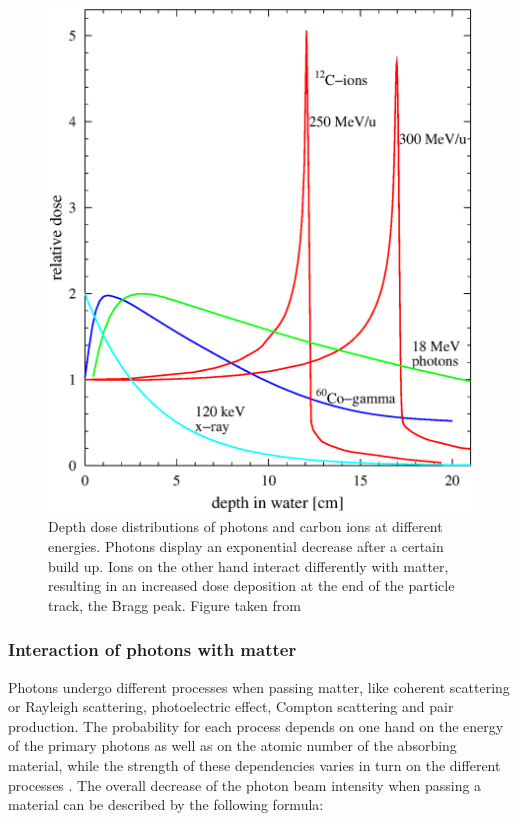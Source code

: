 \begin{figure}[H]
\begin{center}
\includegraphics[scale=0.7]{./teile/introduction/depthdose.eps}
\caption{Depth dose distributions of photons and carbon ions at different energies. Photons display an exponential decrease after a certain 
build up. Ions on the other hand interact differently with matter, resulting in an increased dose deposition at the end of the particle 
track, the Bragg peak. Figure taken from \cite{Sch10}}
\label{ddp}
\end{center}
\end{figure}

\newpage

\subsubsection{Interaction of photons with matter}

Photons undergo different processes when passing matter, like coherent scattering or Rayleigh scattering, photoelectric effect, Compton 
scattering and pair production. The probability for each process depends on one hand on the energy of the primary photons as well as on the 
atomic number of the absorbing material, while the strength of these dependencies varies in turn on the different processes \cite{Lil06}. 
The overall decrease of the photon beam intensity when passing a material can be described by the following formula:

